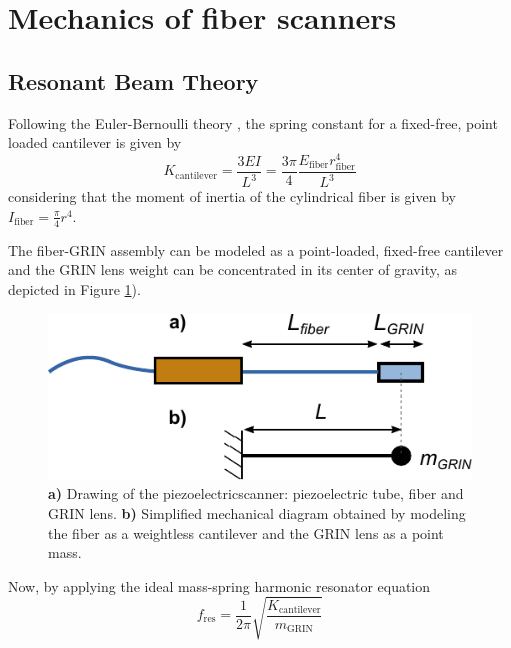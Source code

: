 \newpage
\section{Mechanics of fiber scanners}

\subsection{Resonant Beam Theory}
\label{sec:EB}
Following the Euler-Bernoulli theory \cite{MarcJ.Madou2011}, the spring constant for a fixed-free, point loaded cantilever is given by 
\begin{equation}
K_\mathrm{cantilever} = \frac{3 E I}{L^3} = \frac{3 \pi}{4} \frac{E_\mathrm{fiber} r_\mathrm{fiber}^4}{L^3}
\label{eq:EB}
\end{equation}
considering that the moment of inertia of the cylindrical fiber is given by $I_\mathrm{fiber} = \frac{\pi}{4} r^4$.



The fiber-GRIN assembly can be modeled as a point-loaded, fixed-free cantilever and the GRIN lens weight can be concentrated in its center of gravity, as depicted in Figure \ref{fig:EB}). 
\begin{figure}[h!]\centering
      \includegraphics{figures/30_DesignSimulation/Mechanical/EB.pdf}
      \caption{\textbf{a)} Drawing of the piezoelectricscanner: piezoelectric tube, fiber and GRIN lens. 
      \textbf{b)} Simplified mechanical diagram obtained by modeling the fiber as a weightless cantilever and the GRIN lens as a point mass.}
      \label{fig:EB}
\end{figure}
Now, by applying the ideal mass-spring harmonic resonator equation 
\begin{equation}
f_\mathrm{res} = \frac{1}{2 \pi} \sqrt{\frac{K_\mathrm{cantilever}}{m_{\mathrm{GRIN}}}} 
\label{eq:fres}
\end{equation}

